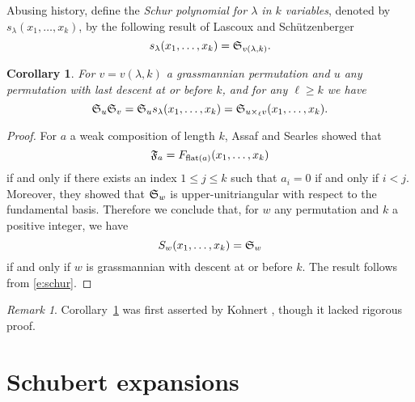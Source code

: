 \documentclass[11pt]{amsart}
\newtheorem{corollary}[theorem]{Corollary}
\theoremstyle{definition}
\theoremstyle{remark}
\newtheorem{remark}[theorem]{Remark}
\numberwithin{equation}{section}
\newcommand{\schubert}{\ensuremath\mathfrak{S}}
\newcommand{\fund}{\ensuremath\mathfrak{F}}
\newcommand{\stanley}{\ensuremath{S}}
\begin{document}
Abusing history, define the \emph{Schur polynomial for $\lambda$ in $k$ variables}, denoted by $s_{\lambda}(x_1,\ldots,x_k)$, by the following result of Lascoux and Sch{\"u}tzenberger \cite{LS82}
\begin{equation}
  s_{\lambda}(x_1,\ldots,x_k) = \schubert_{v(\lambda,k)}.
  \label{e:schur}
\end{equation}

\begin{corollary}
  For $v = v(\lambda,k)$ a grassmannian permutation and $u$ any permutation with last descent at or before $k$, and for any $\ell\geq k$ we have
  \begin{equation}
    \schubert_{u} \schubert_{v} = \schubert_{u} s_{\lambda}(x_1,\ldots,x_k) = \schubert_{u \times_{\ell} v}(x_1,\ldots,x_k).
    \label{e:kohnert}
  \end{equation}
  \label{cor:kohnert}
\end{corollary}

\begin{proof}
  For $a$ a weak composition of length $k$, Assaf and Searles \cite{AS17} showed that
  \begin{displaymath}
    \fund_{a} = F_{\mathrm{flat}(a)} (x_1,\ldots,x_k)
  \end{displaymath}
  if and only if there exists an index $1\leq j\leq k$ such that $a_i=0$ if and only if $i<j$. Moreover, they showed that $\schubert_w$ is upper-unitriangular with respect to the fundamental basis. Therefore we conclude that, for $w$ any permutation and $k$ a positive integer, we have
  \begin{displaymath}
    \stanley_{w} (x_1,\ldots,x_k) = \schubert_w
  \end{displaymath}
  if and only if $w$ is grassmannian with descent at or before $k$. The result follows from \eqref{e:schur}.
\end{proof}

\begin{remark}
  Corollary~\ref{cor:kohnert} was first asserted by Kohnert \cite{Koh91}, though it lacked rigorous proof.
\end{remark}


%
\section{Schubert expansions}
%
\label{sec:trunc}
\end{document}
